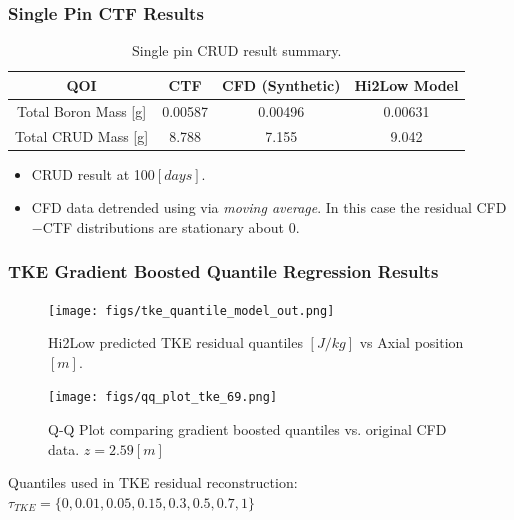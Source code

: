 \documentclass[t, pdftex]{beamer}
\begin{document}
\begin{frame}\frametitle{Single Pin CTF Results}
\begin{table}[h!]
\begin{center}
\begin{tabular}{|c|c|c|c|}
\hline 
 QOI  &   CTF	&  CFD (Synthetic)	& Hi2Low Model \\ \hline
Total Boron Mass [g]& 0.00587	&  0.00496	& 0.00631 \\
Total CRUD Mass [g]	& 8.788	&  7.155 & 9.042	\\
\hline
\end{tabular}
\caption{Single pin CRUD result summary.}
\label{tab:crud_res}
\end{center}
\end{table}
\begin{itemize}
\item CRUD result at 100$[days]$.  
\item CFD data detrended using via \emph{moving average}.  In this case the residual CFD$-$CTF distributions are stationary about 0.
\end{itemize}
\end{frame}

\begin{frame}\frametitle{TKE Gradient Boosted Quantile Regression Results}
    \begin{figure}
        \centering
        \begin{minipage}{.5\textwidth}
            \centering
            \texttt{[image: figs/tke\_quantile\_model\_out.png]}
            \caption{Hi2Low predicted TKE residual quantiles $[J/kg]$ vs Axial position $[m]$.}
        \end{minipage}%
        \begin{minipage}{.5\textwidth}
            \centering
            \texttt{[image: figs/qq\_plot\_tke\_69.png]}
            \caption{Q-Q Plot comparing gradient boosted quantiles vs. original CFD data. $z=2.59[m]$}
        \end{minipage}
    \end{figure}
Quantiles used in TKE residual reconstruction: $\tau_{TKE}=\{0, 0.01, 0.05, 0.15, 0.3, 0.5, 0.7, 1\}$
\end{frame}
\end{document}
